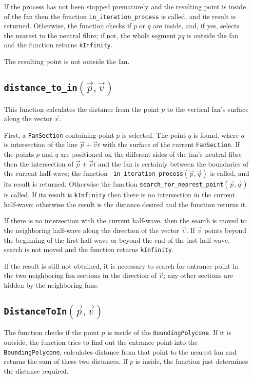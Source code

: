 \documentclass{article}
\begin{document}
If the process has not been stopped prematurely and the resulting
 point is inside of the fan then the
function {\tt in\_iteration\_process} is called, and its result is returned.
Otherwise, the function checks if $p$ or $q$ are inside, and, if yes, selects the
nearest to the neutral fibre; if not,
the whole segment $pq$ is outside the fan and the
function returns {\tt kInfinity}.

The resulting point is not outside the fan.

\subsection{\tt distance\_to\_in$(\vec{p}, \vec{v})$}
This function calculates the distance from the point $p$ to the vertical fan's
surface along the vector $\vec{v}$.

First, a {\tt FanSection} containing point $p$ is selected. The point $q$ is
found, where $q$ is intersection of the line $\vec{p}+\vec{v}t$ 
with the surface of the current {\tt FanSection}. If the points $p$
and $q$ are positioned on the different sides of the fan's neutral fibre
then the intersection of $\vec{p}+\vec{v}t$
and the fan is certainly between the
boundaries of the current half-wave; the function {\tt
in\_iteration\_process$(\vec{p}, \vec{q})$} is called, and its result is
returned. Otherwise the function {\tt search\_for\_nearest\_point$(\vec{p},
\vec{q})$} is called. If its result is {\tt kInfinity}
then there is no intersection
in the current half-wave; otherwise the result is the distance desired and the
function returns it.

If there is no intersection with the current half-wave, then the search is moved
to the neighboring half-wave along the direction of the vector $\vec{v}$. If
$\vec{v}$ points beyond the beginning of the first half-wave or beyond the end of
the last half-wave, search is not moved and the function returns {\tt kInfinity}.

If the result is still not obtained, it is necessary to search for entrance
point
in the two neighboring fan sections in the 
direction of $\vec{v}$; any other sections are hidden by
the neighboring fans.

\subsection{\tt DistanceToIn$(\vec{p}, \vec{v})$}
The function checks if the point $p$ is inside of the {\tt BoundingPolycone}.
If it is outside, the function tries to find out the entrance point into the {\tt
BoundingPolycone}, calculates distance from that point to the nearest fan and
returns the sum of these two distances.
If $p$ is inside, the function just determines the distance required.
\end{document}
